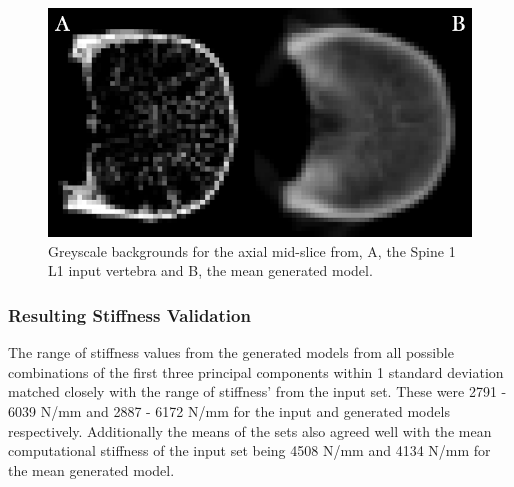 \begin{figure}[h!]
  \centering
  \includegraphics[width=.6\textwidth]{Chapters/Chapter_PCA_images/INPUT_GEN_BACKGROUND.png}
	\caption{Greyscale backgrounds for the axial mid-slice from, A, the Spine 1 L1 input vertebra and B, the mean generated model.}
  \label{fig:input_gen_background}
\end{figure}
\subsubsection{Resulting Stiffness Validation}

The range of stiffness values from the generated models from all possible combinations of the first three principal components within 1 standard deviation matched closely with the range of stiffness' from the input set. These were 2791 - 6039 N/mm and 2887 - 6172 N/mm for the input and generated models respectively. Additionally the means of the sets also agreed well with the mean computational stiffness of the input set being 4508 N/mm and 4134 N/mm for the mean generated model.


